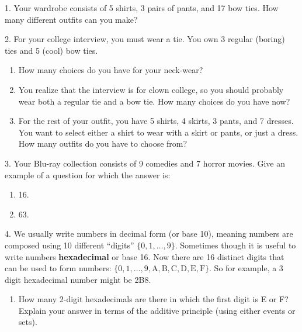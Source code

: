 \documentclass[10pt,]{book}
\newcommand{\terminology}[1]{\textbf{#1}}
\theoremstyle{plain}
\theoremstyle{definition}
\numberwithin{equation}{chapter}
\begin{document}
\begin{exerciselist}
\item[1.]\hypertarget{exercise-43}{}
          Your wardrobe consists of 5 shirts, 3 pairs of pants, and 17 bow ties. How many different outfits can you make?
\par\smallskip
\item[2.]\hypertarget{exercise-44}{}
          For your college interview, you must wear a tie. You own 3 regular (boring) ties and 5 (cool) bow ties.
          \leavevmode%
\begin{enumerate}[label=(\alph*)]
\item\hypertarget{li-182}{}
              How many choices do you have for your neck-wear?
\item\hypertarget{li-183}{}
                You realize that the interview is for clown college, so you should probably wear both a regular tie and a bow tie. How many choices do you have now?
\item\hypertarget{li-184}{}
                For the rest of your outfit, you have 5 shirts, 4 skirts, 3 pants, and 7 dresses. You want to select either a shirt to wear with a skirt or pants, or just a dress. How many outfits do you have to choose from?
\end{enumerate}

\par\smallskip
\item[3.]\hypertarget{exercise-45}{}
          Your Blu-ray collection consists of 9 comedies and 7 horror movies. Give an example of a question for which the answer is:
        \leavevmode%
\begin{enumerate}[label=(\alph*)]
\item\hypertarget{li-188}{}
              16.
\item\hypertarget{li-189}{}
              63.
\end{enumerate}

\par\smallskip
\item[4.]\hypertarget{exercise-46}{}
          We usually write numbers in decimal form (or base 10), meaning numbers are composed using 10 different ``digits'' \(\{0,1,\ldots, 9\}\). Sometimes though it is useful to write numbers \terminology{hexadecimal} or base 16. Now there are 16 distinct digits that can be used to form numbers: \(\{0, 1, \ldots, 9, \mathrm{A, B, C, D, E, F}\}\). So for example, a 3 digit hexadecimal number might be 2B8.
        \leavevmode%
\begin{enumerate}[label=(\alph*)]
\item\hypertarget{li-192}{}
              How many 2-digit hexadecimals are there in which the first digit is E or F? Explain your answer in terms of the additive principle (using either events or sets).



\end{enumerate}
\end{exerciselist}
\end{document}
